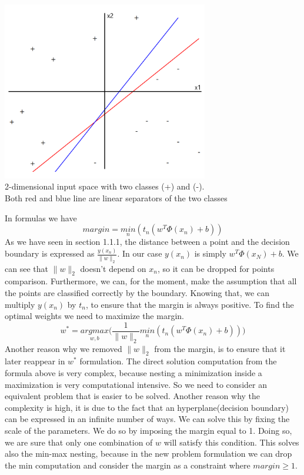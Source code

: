 \documentclass[main.tex]{subfiles}
\begin{document}
\begin{center}
    \includegraphics[width=90mm]{img/SVM_Margin.PNG} \\
    2-dimensional input space with two classes (+) and (-). \\
    Both red and blue line are linear separators of the two classes
\end{center}
In formulas we have
\begin{equation}
    margin = \underset{n}{min} (t_n (w^T \Phi(x_n) + b))
\end{equation}
As we have seen in section 1.1.1, the distance between a point and the decision boundary is expressed as $\frac{y(x_n)}{\|w\|_2}$. In our case $y(x_n)$ is simply $w^T\Phi(x_N) + b$. We can see that $\|w\|_2$ doesn't depend on $x_n$, so it can be dropped for points comparison. Furthermore, we can, for the moment, make the assumption that all the points are classified correctly by the boundary. Knowing that, we can multiply $y(x_n)$ by $t_n$, to ensure that the margin is always positive.
\newline
To find the optimal weights we need to maximize the margin.
\begin{equation*}
    w^* = \underset{w,b}{argmax} \bigg( \frac{1}{\|w\|_2} \underset{n}{min} (t_n (w^T \Phi(x_n) + b)) \bigg)
\end{equation*}
Another reason why we removed $\|w\|_2$ from the margin, is to ensure that it later reappear in $w^*$ formulation.
The direct solution computation from the formula above is very complex, because nesting a minimization inside a maximization is very computational intensive. So we need to consider an equivalent problem that is easier to be solved. Another reason why the complexity is high, it is due to the fact that an hyperplane(decision boundary) can be expressed in an infinite number of ways\footnotemark. We can solve this by fixing the scale of the parameters. We do so by imposing the margin equal to 1. Doing so, we are sure that only one combination of $w$ will satisfy this condition. This solves also the min-max nesting, because in the new problem formulation we can drop the min computation and consider the margin as a constraint where $margin \geq 1$.
\end{document}
